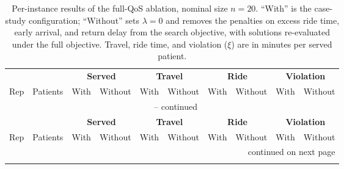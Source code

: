 \begingroup
\footnotesize
\setlength{\tabcolsep}{6pt}
\renewcommand{\arraystretch}{0.90}

\begin{longtable}{rrrrrrrrrr}
\caption{Per-instance results of the full-QoS ablation, nominal size $n=20$. ``With'' is the case-study configuration; ``Without'' sets $\lambda=0$ and removes the penalties on excess ride time, early arrival, and return delay from the search objective, with solutions re-evaluated under the full objective. Travel, ride time, and violation ($\xi$) are in minutes per served patient.}
\label{tab:noqos-per-instance} \\
\toprule
& & \multicolumn{2}{c}{\textbf{Served}} & \multicolumn{2}{c}{\textbf{Travel}} & \multicolumn{2}{c}{\textbf{Ride}} & \multicolumn{2}{c}{\textbf{Violation}} \\
\cmidrule(lr){3-4}\cmidrule(lr){5-6}\cmidrule(lr){7-8}\cmidrule(lr){9-10}
Rep & Patients & With & Without & With & Without & With & Without & With & Without \\
\midrule
\endfirsthead

\multicolumn{10}{c}{\tablename\ \thetable{} -- continued} \\
\toprule
& & \multicolumn{2}{c}{\textbf{Served}} & \multicolumn{2}{c}{\textbf{Travel}} & \multicolumn{2}{c}{\textbf{Ride}} & \multicolumn{2}{c}{\textbf{Violation}} \\
\cmidrule(lr){3-4}\cmidrule(lr){5-6}\cmidrule(lr){7-8}\cmidrule(lr){9-10}
Rep & Patients & With & Without & With & Without & With & Without & With & Without \\
\midrule
\endhead

\midrule
\multicolumn{10}{r}{continued on next page} \\
\endfoot

\bottomrule
\endlastfoot


\end{longtable}
